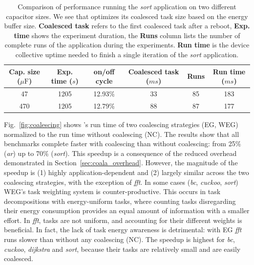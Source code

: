 \begin{table}
\begin{center}
\begin{tabular}{c c c c c c}
  \toprule
    \textbf{Cap. size} ($\mu\text{F}$)& \textbf{Exp. time} ($s$)& \textbf{on/off cycle} & \textbf{Coalesced task} ($ms$)   & \textbf{Runs} & \textbf{Run time} ($ms$) \\
        \hline
    47                 &1205             & 12.93\%    & 33                        & 85       & 183      \\
    470                &1205             & 12.79\%    & 88                        & 87       & 177 \\
  \bottomrule
\end{tabular}
\end{center}
\caption{Comparison of \sys performance running the \textit{sort} application on two different capacitor sizes. We see that \sys optimizes its coalesced task size based on the energy buffer size.
	\textbf{Coalesced task} refers to the first coalesced task after a reboot, \textbf{Exp. time} shows the experiment duration, the \textbf{Runs} column lists the number of complete runs of the application during the experiments. \textbf{Run time} is the device collective uptime needed to finish a single iteration of the \textit{sort} application.}
\label{tab:dif_cap}
\end{table}%

Fig.~\ref{fig:coalescing} shows \sys's run time of two coalescing
strategies (EG, WEG) normalized to the run time without coalescing (NC).
%
The results show that all benchmarks
complete faster with coalescing than without coalescing: from 25\%
(\textit{ar}) up to 70\% (\textit{sort}).
%
This speedup is a consequence of the reduced overhead demonstrated in
Section~\ref{sec:coala_overhead}.
%
However, the magnitude of the speedup is (1) highly application-dependent and
(2) largely similar across the two coalescing strategies, with the exception of
\textit{fft}.
%
In some cases (\textit{bc}, \textit{cuckoo}, \textit{sort}) WEG's task weighting
system is counter-productive.
%
This occurs in task decompositions with energy-uniform tasks, where counting
tasks disregarding their energy consumption provides an equal amount of information
with a smaller effort.
%
In \textit{fft}, tasks are not uniform, and accounting for their different weights is
beneficial. In fact, the lack of task energy awareness is detrimental: with EG
\textit{fft} runs slower than without any coalescing (NC).
%
The speedup is highest for \textit{bc}, \textit{cuckoo}, \textit{dijkstra} and
\textit{sort}, because their tasks are relatively small and are easily coalesced.
%

